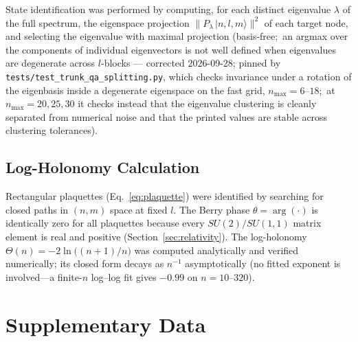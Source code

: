 \documentclass[aps,pra,twocolumn,superscriptaddress,longbibliography]{revtex4-2}
\begin{document}
State identification was performed by computing, for each distinct eigenvalue $\lambda$ of the full spectrum, the eigenspace projection $\|P_\lambda\,|n,l,m\rangle\|^2$ of each target node, and selecting the eigenvalue with maximal projection (basis-free;\ an argmax over the components of individual eigenvectors is not well defined when eigenvalues are degenerate across $l$-blocks --- corrected 2026-09-28; pinned by \texttt{tests/test\_trunk\_qa\_splitting.py}, which checks invariance under a rotation of the eigenbasis inside a degenerate eigenspace on the fast grid, $n_{\max} = 6$--$18$;\ at $n_{\max} = 20, 25, 30$ it checks instead that the eigenvalue clustering is cleanly separated from numerical noise and that the printed values are stable across clustering tolerances).

\subsection{Log-Holonomy Calculation}

Rectangular plaquettes (Eq.~\ref{eq:plaquette}) were identified by searching
for closed paths in $(n,m)$ space at fixed $l$.  The Berry phase
$\theta = \arg(\cdot)$ is identically zero for all plaquettes because every
$SU(2)/SU(1,1)$ matrix element is real and positive
(Section~\ref{sec:relativity}).  The log-holonomy
$\Theta(n) = -2\ln\bigl((n+1)/n\bigr)$ was computed analytically and
verified numerically; its closed form decays as $n^{-1}$ asymptotically (no fitted exponent is involved---a finite-$n$ log--log fit gives $-0.99$ on $n = 10$--$320$).


\section{Supplementary Data}
\end{document}
